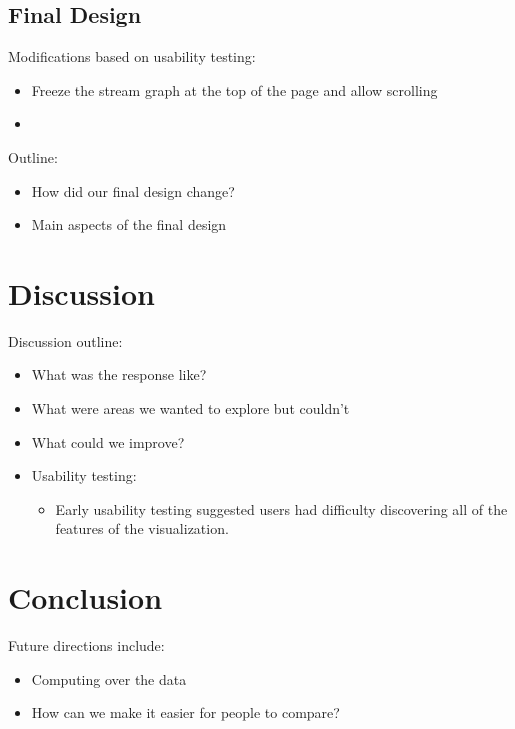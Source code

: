 \documentclass[journal]{vgtc}                %
\begin{document}


\subsection{Final Design}

Modifications based on usability testing:
\begin{itemize}
  \item Freeze the stream graph at the top of the page and allow scrolling
  \item 
\end{itemize}

Outline:
\begin{itemize}
  \item How did our final design change?
  \item Main aspects of the final design
\end{itemize}

\section{Discussion}

Discussion outline:
\begin{itemize}
  \item What was the response like?
  \item What were areas we wanted to explore but couldn't
  \item What could we improve?
  \item Usability testing:
  \begin{itemize}
    \item Early usability testing suggested users had difficulty discovering all of the features of the visualization.
  \end{itemize}
\end{itemize}

\section{Conclusion}

Future directions include:
\begin{itemize}
  \item Computing over the data
  \item How can we make it easier for people to compare?
\end{itemize}


%

%
%
%


\end{document}
